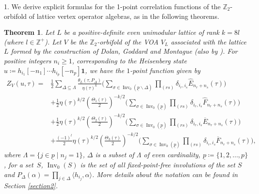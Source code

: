 \documentclass[pdftex]{sigma}
\numberwithin{equation}{section}
\newtheorem{Theorem}{Theorem}[section]
\theoremstyle{definition}
\begin{document}
1. We derive explicit formulas for the 1-point correlation functions of the \( \mathbb{Z}_2 \)-orbifold of lattice vertex operator algebras, as in the following theorems.
 \begin{Theorem}
Let $L$ be a positive-definite even unimodular lattice of rank $k=8l$ {\rm(}where $l\in \mathbb{Z}^+${\rm)}. Let $V$ be the $\mathbb{Z}_2$-orbifold of the VOA $V_L$ associated with the lattice $L$ formed by the construction of Dolan, Goddard and Montague {\rm\cite{Dolan1990ConformalOperators} (}also by {\rm\cite{van2020Construction})}.
For positive integers $n_i\geq 1$, corresponding to the Heisenberg state
$u\coloneqq h_{i_1}[-n_1]\cdots h_{i_p}[-n_p]\mathbf{1}$,
we have the $1$-point function given by
\begin{align*}
Z_V(u,\tau)={}&\frac{1}{2}\sum_{\Delta\subseteq \Lambda}\frac{\theta_L(\tau,P_{\Delta})}{\eta(\tau)^k}\bigg(\sum_{\sigma\in \operatorname{Inv}_0(\underline{p}\backslash \Delta)}\prod_{(rs)}\delta_{i_r,i_s}\hat{E}_{n_r+n_s}(\tau)\bigg)\\
&+\frac{1}{2}\eta(\tau)^{k/2}\left(\frac{\Theta_1(\tau)}{2}\right)^{-k/2}\bigg(\sum_{\sigma\in \operatorname{Inv}_0(\underline{p})} \prod_{(rs)}\delta_{i_r,i_s}\hat{F}_{n_r+n_s}(\tau) \bigg)\\
&+\frac{1}{2}\eta(\tau)^{k/2}\left(\frac{\Theta_2(\tau)}{2}\right)^{-k/2}\bigg(\sum_{\sigma\in \operatorname{Inv}_0(\underline{p})}\prod_{(rs)}\delta_{i_r,i_s}\overline{E}_{n_r+n_s}(\tau)\bigg)\\
&+\frac{(-1)^l}{2}\eta(\tau)^{k/2}\left(\frac{\Theta_3(\tau)}{2}\right)^{-k/2}\bigg(\sum_{\sigma\in \operatorname{Inv}_0(\underline{p})}\prod_{(rs)}\delta_{i_r,i_s}\overline{F}_{n_r+n_s}(\tau)\bigg),
\end{align*}
where $\Lambda=\{j\in \underline{p}\mid n_j=1\}$, $\Delta$ is a subset of $\Lambda$ of even cardinality, $\underline{p}\coloneqq \{1,2,\dots, p\}$, for a set~$S$, $\operatorname{Inv}_0(S)$ is the set of all fixed-point-free involutions of the set $S$ and
$P_{\Delta}(\alpha)=\prod_{j\in\Delta}\langle h_{i_j},\alpha\rangle$.
More details about the notation can be found in Section {\rm\ref{section2}}.
 \end{Theorem}
\end{document}
